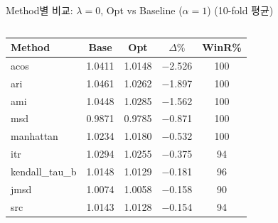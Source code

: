 \documentclass[aspectratio=169,10pt]{beamer}
\begin{document}
\begin{frame}[shrink=8]{Method별 비교: $\lambda=0$, Opt vs Baseline ($\alpha=1$) \textnormal{\small(10-fold 평균)}}
	\begin{columns}[T]
			\renewcommand{\arraystretch}{1.15}
			\small
			\begin{tabular}{l|c|c|c|c}
				\toprule
				Method & Base & Opt & $\Delta\%$ & WinR\% \\
				\midrule
				acos          & 1.0411 & 1.0148 & \textcolor{testgreen}{$-$2.526} & 100 \\
				ari           & 1.0461 & 1.0262 & \textcolor{testgreen}{$-$1.897} & 100 \\
				ami           & 1.0448 & 1.0285 & \textcolor{testgreen}{$-$1.562} & 100 \\
				msd           & 0.9871 & 0.9785 & \textcolor{testgreen}{$-$0.871} & 100 \\
				manhattan     & 1.0234 & 1.0180 & \textcolor{testgreen}{$-$0.532} & 100 \\
				itr           & 1.0294 & 1.0255 & \textcolor{testgreen}{$-$0.375} &  94 \\
				kendall\_tau\_b & 1.0148 & 1.0129 & \textcolor{testgreen}{$-$0.181} &  96 \\
				jmsd          & 1.0074 & 1.0058 & \textcolor{testgreen}{$-$0.158} &  90 \\
				src           & 1.0143 & 1.0128 & \textcolor{testgreen}{$-$0.154} &  94 \\
				\bottomrule
			\end{tabular}


\end{columns}
\end{frame}
\end{document}
